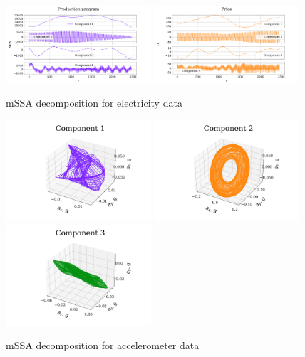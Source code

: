 \documentclass[referee, pdflatex]{sn-jnl}
\theoremstyle{definition}
\theoremstyle{plain}
\begin{document}
	\begin{figure}[h]
		\centering
		\includegraphics[width=0.48\textwidth, keepaspectratio]{../../experiments/electricity/mssa/figs/decomposition/manual/grouping_1/Production_program.png}
		\includegraphics[width=0.48\textwidth, keepaspectratio]{../../experiments/electricity/mssa/figs/decomposition/manual/grouping_1/Price.png}
		\caption{mSSA decomposition for electricity data}\label{fig:electr_decomp_mssa}
	\end{figure}
	
	\begin{figure}[h]
		\centering
		\includegraphics[width=0.48\textwidth, keepaspectratio]{../../experiments/motion/mssa/figs/decomposition/manual/grouping_2/acceler_1.png}
		\includegraphics[width=0.48\textwidth, keepaspectratio]{../../experiments/motion/mssa/figs/decomposition/manual/grouping_2/acceler_2.png}
		\includegraphics[width=0.48\textwidth, keepaspectratio]{../../experiments/motion/mssa/figs/decomposition/manual/grouping_2/acceler_3.png}
		\caption{mSSA decomposition for accelerometer data}\label{fig:accel_decomp_mssa}
	\end{figure}
	
\end{document}
